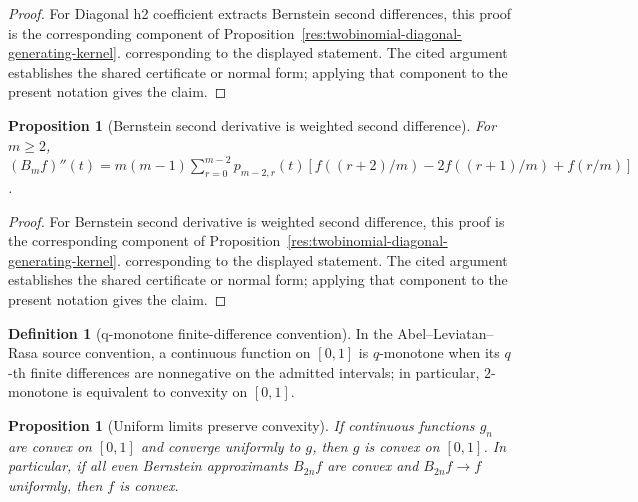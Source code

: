 \documentclass[11pt]{article}
\numberwithin{equation}{section}
\newtheorem{proposition}[theorem]{Proposition}
\theoremstyle{definition}
\newtheorem{definition}{Definition}[section]
\theoremstyle{remark}
\newcommand{\1}{\mathbf 1}
\begin{document}
\begin{proof}
For Diagonal h2 coefficient extracts Bernstein second differences, this proof is the corresponding component of Proposition~\ref{res:twobinomial-diagonal-generating-kernel}.  corresponding to the displayed statement.  The cited argument establishes the shared certificate or normal form; applying that component to the present notation gives the claim.
\end{proof}

\begin{proposition}[Bernstein second derivative is weighted second difference]
\label{res:bernstein-second-derivative-discrete-difference}
For \(m\ge2\), \((B_mf)''(t)=m(m-1)\sum_{r=0}^{m-2}p_{m-2,r}(t)[f((r+2)/m)-2f((r+1)/m)+f(r/m)]\).
\end{proposition}

\begin{proof}
For Bernstein second derivative is weighted second difference, this proof is the corresponding component of Proposition~\ref{res:twobinomial-diagonal-generating-kernel}.  corresponding to the displayed statement.  The cited argument establishes the shared certificate or normal form; applying that component to the present notation gives the claim.
\end{proof}

\begin{definition}[q-monotone finite-difference convention]
\label{res:q-monotone-finite-difference}
In the Abel--Leviatan--Rasa source convention, a continuous function on \([0,1]\) is \(q\)-monotone when its \(q\)-th finite differences are nonnegative on the admitted intervals; in particular, \(2\)-monotone is equivalent to convexity on \([0,1]\).
\end{definition}

\begin{proposition}[Uniform limits preserve convexity]
\label{res:uniformlimit-convexity-closure}
If continuous functions \(g_n\) are convex on \([0,1]\) and converge uniformly to \(g\), then \(g\) is convex on \([0,1]\). In particular, if all even Bernstein approximants \(B_{2n}f\) are convex and \(B_{2n}f\to f\) uniformly, then \(f\) is convex.
\end{proposition}
\end{document}
